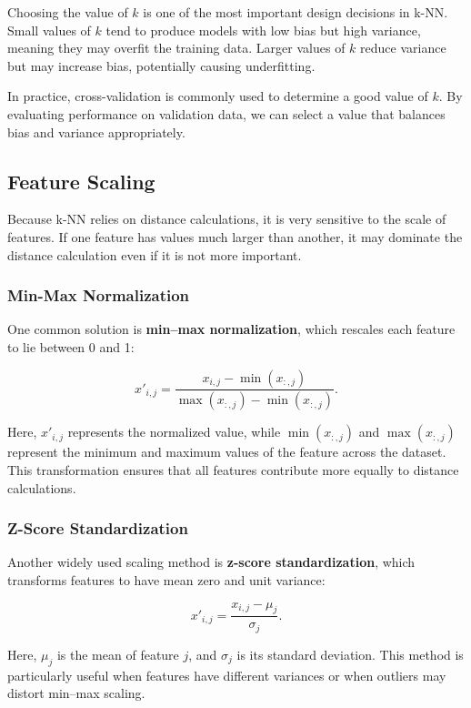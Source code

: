 \documentclass{article}
\begin{document}
Choosing the value of \(k\) is one of the most important design decisions in k-NN. Small values of \(k\) tend to produce models with low bias but high variance, meaning they may overfit the training data. Larger values of \(k\) reduce variance but may increase bias, potentially causing underfitting.

In practice, cross-validation is commonly used to determine a good value of \(k\). By evaluating performance on validation data, we can select a value that balances bias and variance appropriately.

\subsection{Feature Scaling}

Because k-NN relies on distance calculations, it is very sensitive to the scale of features. If one feature has values much larger than another, it may dominate the distance calculation even if it is not more important.

\subsubsection{Min-Max Normalization}

One common solution is \textbf{min–max normalization}, which rescales each feature to lie between 0 and 1:

\[
x'_{i,j} =
\frac{x_{i,j} - \min(x_{:,j})}
{\max(x_{:,j}) - \min(x_{:,j})}.
\]

Here, \(x'_{i,j}\) represents the normalized value, while \(\min(x_{:,j})\) and \(\max(x_{:,j})\) represent the minimum and maximum values of the feature across the dataset. This transformation ensures that all features contribute more equally to distance calculations.

\subsubsection{Z-Score Standardization}

Another widely used scaling method is \textbf{z-score standardization}, which transforms features to have mean zero and unit variance:

\[
x'_{i,j} =
\frac{x_{i,j} - \mu_j}{\sigma_j}.
\]

Here, \(\mu_j\) is the mean of feature \(j\), and \(\sigma_j\) is its standard deviation. This method is particularly useful when features have different variances or when outliers may distort min–max scaling.
\end{document}
